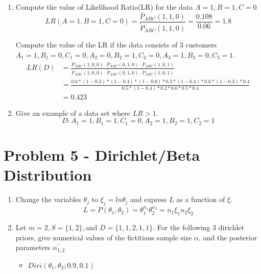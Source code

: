 \documentclass[preprint,12pt]{elsarticle}
\begin{document}
\begin{enumerate}[label=\alph*]
		\item Compute the value of Likelihood Ratio(LR) for the data $A=1,B=1,C=0$
		\begin{equation*}
			LR(A=1,B=1,C=0) = \frac{\bar{P}_{ABC}(1,1,0)}{\tilde{P}_{ABC}(1,1,0)} = \frac{0.108}{0.06} = 1.8
		\end{equation*}

		Compute the value of the LR if the data consists of 3 customers 
		$A_1=1,B_1=0,C_1=0,A_2=0,B_2=1,C_2=0,A_3=1,B_3=0,C_3=1$.
		\begin{align*}
			LR(D) &= \frac{\bar{P}_{ABC}(1,0,0)\cdot \bar{P}_{ABC}(0,1,0)\cdot \bar{P}_{ABC}(1,0,1)}{\tilde{P}_{ABC}(1,0,0)\cdot \tilde{P}_{ABC}(0,1,0)\cdot \tilde{P}_{ABC}(1,0,1)}\\
			&= \frac{0.6*(1-0.3)*(1-0.4)*(1-0.6)*0.3*(1-0.4)*0.6*(1-0.3)*0.4}{0.5*(1-0.4)*0.2*0.6*0.5*0.4}\\
			&= 0.423
		\end{align*}

		\item Give an example of a data set where $LR>1$.
		\begin{equation*}
			D:A_1=1,B_1=1,C_1=0,A_2=1,B_2=1,C_2=1
		\end{equation*}
		
	\end{enumerate}

	\section{Problem 5 - Dirichlet/Beta Distribution}
	\begin{enumerate}[label=\alph*]
		\item Change the variables $\theta_j$ to $\xi_j=ln \theta_j$ and express
		$L$ as a function of $\xi$.
		\begin{equation*}
			L = P(\theta_1,\theta_2) = \theta_1^{n_1}\theta_2^{n_2} = n_1\xi_1 n_2\xi_2
		\end{equation*}

		\item Let $m=2,S=\{1,2\}, $and $D=\{1,1,2,1,1\}$. For the following 3 dirichlet priors, give numerical values of the fictitious sample size $\alpha$, and the posterior parameters $\alpha_{1,2}^{'}$

		\begin{itemize}
			\item $Diri(\theta_1,\theta_2;0.9,0.1)$
		\end{itemize}
		
	\end{enumerate}
\end{document}
